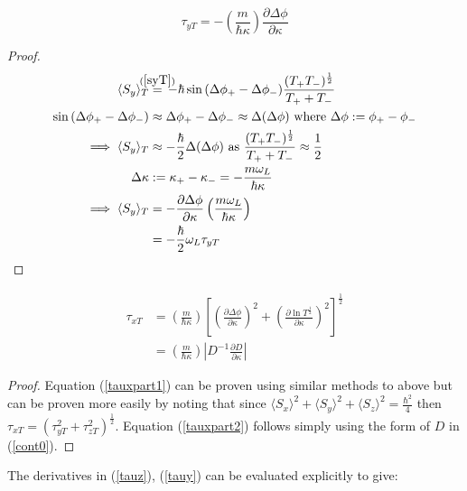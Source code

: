\documentclass{article}
\begin{document}
\begin{equation}
	\tau_{yT} = -\left(\frac{m}{\hbar\kappa}\right)\frac{\partial\Delta\phi}{\partial\kappa} \label{tauy}
\end{equation}

\begin{proof}
\begin{align}
	\langle S_y \rangle_T &\stackrel{\mathclap{(\ref{syT})}}{=}\,-\hbar \sin{(\Delta\phi_+-\Delta\phi_-)}\frac{(T_+T_-)^{\frac{1}{2}}}{T_++T_-}\\
	\sin{(\Delta\phi_+-\Delta\phi_-)} &\approx \Delta\phi_+-\Delta\phi_- \approx \Delta(\Delta\phi) \text{ where } \Delta\phi := \phi_+-\phi_-\\
	\implies \langle S_y \rangle_T &\approx -\frac{\hbar}{2}\Delta(\Delta\phi) \text{ as } \frac{(T_+T_-)^{\frac{1}{2}}}{T_++T_-} \approx \frac{1}{2} \\
	\Delta\kappa &:= \kappa_+-\kappa_- = -\frac{m\omega_L}{\hbar\kappa} \\
\implies \langle S_y \rangle_T &= -\frac{\partial\Delta\phi}{\partial\kappa}\left(\frac{m\omega_L}{\hbar\kappa}\right) \\
			       &=-\frac{\hbar}{2}\omega_L\tau_{yT}
\end{align}
\end{proof}

\begin{subequations}\label{taux}
\begin{align}
	\tau_{xT} &= \left(\frac{m}{\hbar\kappa}\right)\left[\left(\frac{\partial\Delta\phi}{\partial\kappa}\right)^2+\left(\frac{\partial\ln{T^{\frac{1}{2}}}}{\partial\kappa}\right)^2\right]^{\frac{1}{2}}\label{tauxpart1} \\
	       &=\left(\frac{m}{\hbar\kappa}\right)\left|D^{-1}\frac{\partial D}{\partial\kappa}\right| \label{tauxpart2}
\end{align}
\end{subequations}

\begin{proof} Equation (\ref{tauxpart1}) can be proven using similar methods to above but can be proven more easily by noting that since $\langle S_x \rangle^2 + \langle S_y \rangle^2 + \langle S_z \rangle^2 = \frac{\hbar^2}{4}$ then $\tau_{xT} = (\tau_{yT}^2+\tau_{zT}^2)^\frac{1}{2}$. Equation (\ref{tauxpart2}) follows simply using the form of $D$ in (\ref{cont0}).
\end{proof}

\noindent The derivatives in (\ref{tauz}), (\ref{tauy}) can be evaluated explicitly to give:
\end{document}
